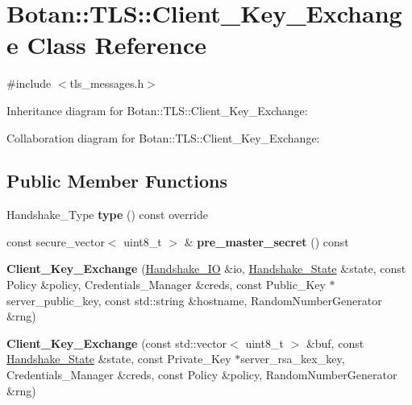 \hypertarget{class_botan_1_1_t_l_s_1_1_client___key___exchange}{}\section{Botan\+:\+:T\+LS\+:\+:Client\+\_\+\+Key\+\_\+\+Exchange Class Reference}
\label{class_botan_1_1_t_l_s_1_1_client___key___exchange}


{\ttfamily \#include $<$tls\+\_\+messages.\+h$>$}



Inheritance diagram for Botan\+:\+:T\+LS\+:\+:Client\+\_\+\+Key\+\_\+\+Exchange\+:


Collaboration diagram for Botan\+:\+:T\+LS\+:\+:Client\+\_\+\+Key\+\_\+\+Exchange\+:
\subsection*{Public Member Functions}
\begin{DoxyCompactItemize}
\item 
\mbox{\label{class_botan_1_1_t_l_s_1_1_client___key___exchange_a0111fef3d825607f5025d68a895fceab}} 
Handshake\+\_\+\+Type {\bfseries type} () const override
\item 
\mbox{\label{class_botan_1_1_t_l_s_1_1_client___key___exchange_a832f8169b1894c78ba5a455fb1a9c32f}} 
const secure\+\_\+vector$<$ uint8\+\_\+t $>$ \& {\bfseries pre\+\_\+master\+\_\+secret} () const
\item 
\mbox{\label{class_botan_1_1_t_l_s_1_1_client___key___exchange_a038639f04d2cbb32f2fa807be5818d52}} 
{\bfseries Client\+\_\+\+Key\+\_\+\+Exchange} (\mbox{\hyperlink{class_botan_1_1_t_l_s_1_1_handshake___i_o}{Handshake\+\_\+\+IO}} \&io, \mbox{\hyperlink{class_botan_1_1_t_l_s_1_1_handshake___state}{Handshake\+\_\+\+State}} \&state, const Policy \&policy, Credentials\+\_\+\+Manager \&creds, const Public\+\_\+\+Key $\ast$server\+\_\+public\+\_\+key, const std\+::string \&hostname, Random\+Number\+Generator \&rng)
\item 
\mbox{\label{class_botan_1_1_t_l_s_1_1_client___key___exchange_a3c0bb659d3069c78362c5f11c151765a}} 
{\bfseries Client\+\_\+\+Key\+\_\+\+Exchange} (const std\+::vector$<$ uint8\+\_\+t $>$ \&buf, const \mbox{\hyperlink{class_botan_1_1_t_l_s_1_1_handshake___state}{Handshake\+\_\+\+State}} \&state, const Private\+\_\+\+Key $\ast$server\+\_\+rsa\+\_\+kex\+\_\+key, Credentials\+\_\+\+Manager \&creds, const Policy \&policy, Random\+Number\+Generator \&rng)
\end{DoxyCompactItemize}


